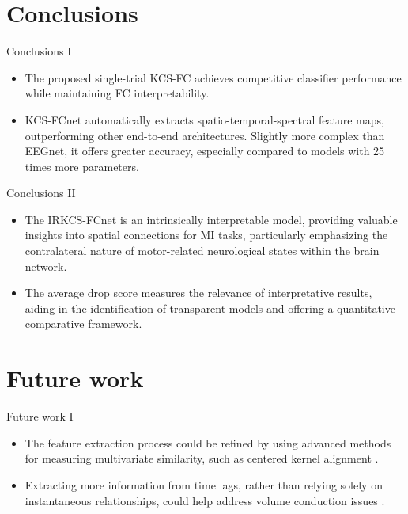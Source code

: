 \documentclass[aspectratio=169]{beamer}
\let\oldcite\cite %
\renewcommand{\cite}[1]{{\tiny\oldcite{#1}}}
\begin{document}
\section{Conclusions}
\begin{frame}{Conclusions I}
    \begin{itemize}
        \item The proposed single-trial KCS-FC achieves competitive classifier performance while maintaining FC interpretability.
        \vspace{2em}
        \item KCS-FCnet automatically extracts spatio-temporal-spectral feature maps, outperforming other end-to-end architectures. Slightly more complex than EEGnet, it offers greater accuracy, especially compared to models with 25 times more parameters.
    \end{itemize}
\end{frame}

\begin{frame}{Conclusions II}
    \begin{itemize}
        \item The IRKCS-FCnet is an intrinsically interpretable model, providing valuable insights into spatial connections for MI tasks, particularly emphasizing the contralateral nature of motor-related neurological states within the brain network.
        \vspace{2em}
        \item The average drop score measures the relevance of interpretative results, aiding in the identification of transparent models and offering a quantitative comparative framework.
    \end{itemize}
\end{frame}


\section{Future work}
\begin{frame}{Future work I}
    \begin{itemize}
        \item The feature extraction process could be refined by using advanced methods for measuring multivariate similarity, such as centered kernel alignment \cite{brockmeier2014neural, Alvarez-Meza2014}.
        \vspace{2em}
        \item Extracting more information from time lags, rather than relying solely on instantaneous relationships, could help address volume conduction issues \cite{uribe2019correntropy, bakhshali2020eeg, de2019data}.
    \end{itemize}
\end{frame}
\end{document}

